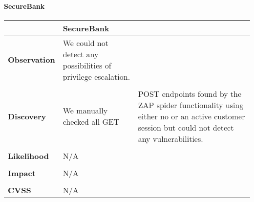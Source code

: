 \begin{longtable*}{p{.20\textwidth} | p{.80\textwidth}}
    \\
    \hline
\end{longtable*}
\paragraph{SecureBank} \mbox{}
\begin{longtable*}{p{.20\textwidth} | p{.80\textwidth}}
    \hline
    & \textbf{SecureBank} \\ 
    \hline
    \textbf{Observation} &
       We could not detect any possibilities of privilege escalation.
    \\\\
    \textbf{Discovery} &
       We manually checked all GET & POST endpoints found by the ZAP spider functionality using either no or an active customer session but could not detect any vulnerabilities.
    \\\\
    \textbf{Likelihood} &
       N/A
    \\\\
    \textbf{Impact} &
        N/A
    \\\\
    \textbf{CVSS} &
        N/A
    \\
    \hline
\end{longtable*}
\clearpage
